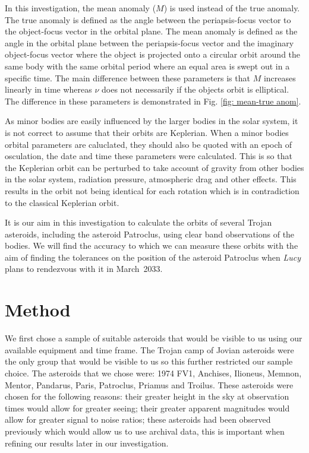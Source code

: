 \documentclass[10pt, twocolumn]{revtex4}    %
\begin{document}
In this investigation, the mean anomaly ($M$) is used instead of the true anomaly. The true anomaly is defined as the angle between the periapsis-focus vector to the object-focus vector in the orbital plane. The mean anomaly is defined as the angle in the orbital plane between the periapsis-focus vector and the imaginary object-focus vector where the object is projected onto a circular orbit around the same body with the same orbital period where an equal area is swept out in a specific time. The main difference between these parameters is that $M$ increases linearly in time whereas $\nu$ does not necessarily if the objects orbit is elliptical. The difference in these parameters is demonstrated in Fig. \ref{fig: mean-true anom}.

As minor bodies are easily influenced by the larger bodies in the solar system, it is not correct to assume that their orbits are Keplerian. When a minor bodies orbital parameters are caluclated, they should also be quoted with an epoch of osculation, the date and time these parameters were calculated. This is so that the Keplerian orbit can be perturbed to take account of gravity from other bodies in the solar system, radiation pressure, atmospheric drag and other effects. This results in the orbit not being identical for each rotation which is in contradiction to the classical Keplerian orbit.

It is our aim in this investigation to calculate the orbits of several Trojan asteroids, including the asteroid Patroclus, using clear band observations of the bodies. We will find the accuracy to which we can measure these orbits with the aim of finding the tolerances on the position of the asteroid Patroclus when \textit{Lucy} plans to rendezvous with it in March~2033.

\section{Method}

We first chose a sample of suitable asteroids that would be visible to us using our available equipment and time frame. The Trojan camp of Jovian asteroids were the only group that would be visible to us so this further restricted our sample choice. The asteroids that we chose were: 1974 FV1, Anchises, Ilioneus, Memnon, Mentor, Pandarus, Paris, Patroclus, Priamus and Troilus. These asteroids were chosen for the following reasons: their greater height in the sky at observation times would allow for greater seeing; their greater apparent magnitudes would allow for greater signal to noise ratios; these asteroids had been observed previously which would allow us to use archival data, this is important when refining our results later in our investigation.
\end{document}
